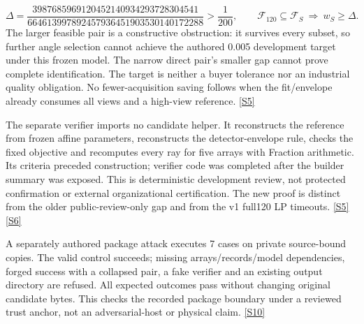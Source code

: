\documentclass[11pt,letterpaper]{article}
\begin{document}
\[\Delta=\frac{3987685969120452140934293728304541}{664613997892457936451903530140172288}>\frac1{200},\qquad \mathcal F_{120}\subseteq\mathcal F_S\ \Longrightarrow\ w_S\geq\Delta.\]
The larger feasible pair is a constructive obstruction: it survives every subset, so further angle selection cannot achieve the authored 0.005 development target under this frozen model. The narrow direct pair's smaller gap cannot prove complete identification. The target is neither a buyer tolerance nor an industrial quality obligation. No fewer-acquisition saving follows when the fit/envelope already consumes all views and a high-view reference. \href{https://github.com/MontrealAI/AGI-Alpha-Invention-Flywheel-Lab/blob/2b7a58e6e6593ae48da6f7f33865db94868c957f/evidence/overnight-008/xct-recovery/xct-fraction-r2-bound/artifacts/REPORT.json}{[S5]}\par
The separate verifier imports no candidate helper. It reconstructs the reference from frozen affine parameters, reconstructs the detector-envelope rule, checks the fixed objective and recomputes every ray for five arrays with Fraction arithmetic. Its criteria preceded construction; verifier code was completed after the builder summary was exposed. This is deterministic development review, not protected confirmation or external organizational certification. The new proof is distinct from the older public-review-only gap and from the v1 full120 LP timeouts. \href{https://github.com/MontrealAI/AGI-Alpha-Invention-Flywheel-Lab/blob/2b7a58e6e6593ae48da6f7f33865db94868c957f/evidence/overnight-008/xct-recovery/xct-fraction-r2-bound/artifacts/REPORT.json}{[S5]} \href{https://github.com/MontrealAI/AGI-Alpha-Invention-Flywheel-Lab/blob/2b7a58e6e6593ae48da6f7f33865db94868c957f/evidence/overnight-008/xct-recovery/xct-fraction-r2-bound/RECEIPT.json}{[S6]}\par
A separately authored package attack executes 7 cases on private source-bound copies. The valid control succeeds; missing arrays/records/model dependencies, forged success with a collapsed pair, a fake verifier and an existing output directory are refused. All expected outcomes pass without changing original candidate bytes. This checks the recorded package boundary under a reviewed trust anchor, not an adversarial-host or physical claim. \href{https://github.com/MontrealAI/AGI-Alpha-Invention-Flywheel-Lab/blob/2b7a58e6e6593ae48da6f7f33865db94868c957f/evidence/overnight-008/verifier-recovery-later/package-negative-bound/artifacts/REPORT.json}{[S10]}\par
\end{document}
